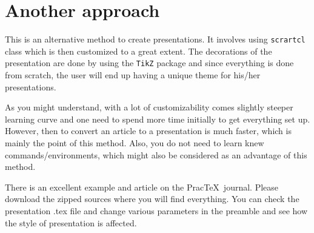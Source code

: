 \section{Another approach}

This is an alternative method to create presentations. It involves using
\verb|scrartcl| class which is then customized to a great extent. The
decorations of the presentation are done by using the \verb|TikZ| package and
since everything is done from scratch, the user will end up having a unique
theme for his/her presentations.

As you might understand, with a lot of customizability comes slightly steeper
learning curve and one need to spend more time initially to get everything set
up. However, then to convert an article to a presentation is much faster, which
is mainly the point of this method. Also, you do not need to learn knew
commands/environments, which might also be considered as an advantage of this
method.

There is an excellent example and article on the Prac\TeX\
journal.\cite{PracTeX-komapres} Please download the zipped sources where you
will find everything. You can check the presentation .tex file and change
various parameters in the preamble and see how the style of presentation is
affected.






